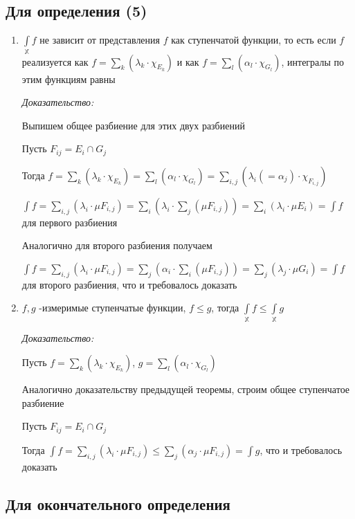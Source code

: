 \documentclass[paper=a4, fontsize=13.2pt]{article}
\begin{document}
\subsection{Для определения (5)}
\begin{enumerate}
	\item $\int\limits_{\mathds{X}}f$ не зависит от представления $f$ как ступенчатой функции, то есть если $f$ реализуется как $f = \sum\limits_{k}(\lambda_k \cdot \chi_{E_k})$ и как $f = \sum\limits_{l}(\alpha_l \cdot \chi_{G_l})$, интегралы по этим функциям равны

	\emph{Доказательство:}

	Выпишем общее разбиение для этих двух разбиений

	Пусть $F_{ij} = E_i \cap G_j$

	Тогда $f = \sum\limits_{k}(\lambda_k \cdot \chi_{E_k}) = \sum\limits_{l}(\alpha_l \cdot \chi_{G_l}) = \sum\limits_{i, j}(\lambda_i (= \alpha_j) \cdot \chi_{F_{i, j}})$

	$\int f = \sum\limits_{i, j}(\lambda_i \cdot \mu F_{i, j}) = \sum\limits_i (\lambda_i \cdot \sum\limits_j (\mu F_{i, j})) = \sum\limits_i (\lambda_i \cdot \mu E_i) = \int f$ для первого разбиения

	Аналогично для второго разбиения получаем

	$\int f = \sum\limits_{i, j}(\lambda_i \cdot \mu F_{i, j}) = \sum\limits_j (\alpha_i \cdot \sum\limits_i (\mu F_{i, j})) = \sum\limits_j (\lambda_j \cdot \mu G_i) = \int f$ для второго разбиения, что и требовалось доказать

	\item $f, g$ -измеримые ступенчатые функции, $f \leqslant g$, тогда $\int\limits_{\mathds{X}} f \leqslant \int\limits_{\mathds{X}} g$

	\emph{Доказательство:}

	Пусть $f = \sum\limits_{k}(\lambda_k \cdot \chi_{E_k})$, $g = \sum\limits_{l}(\alpha_l \cdot \chi_{G_l})$

	Аналогично доказательству предыдущей теоремы, строим общее ступенчатое разбиение

	Пусть $F_{ij} = E_i \cap G_j$

	Тогда $\int f = \sum\limits_{i, j}(\lambda_i \cdot \mu F_{i, j}) \leqslant \sum\limits_j(\alpha_j \cdot \mu F_{i, j}) = \int g$, что и требовалось доказать
\end{enumerate}

\subsection{Для окончательного определения}
\end{document}
